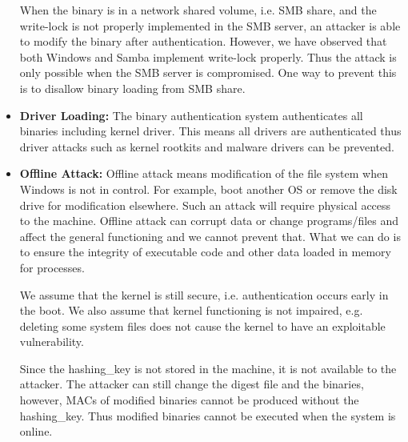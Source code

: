 \begin{itemize}
When the binary is in a network shared volume, i.e. SMB share,
and the write-lock is not properly implemented in the SMB server,
an attacker is able to modify the binary after authentication.
However, we have observed that both Windows and Samba
implement write-lock properly.
Thus the attack is only possible when the SMB server is compromised.
One way to prevent this is to disallow binary loading from SMB share.

\item {\bf Driver Loading:}
The binary authentication system authenticates all binaries including
kernel driver.
This means all drivers are authenticated thus driver attacks such as
kernel rootkits and malware drivers can be prevented.

\item {\bf Offline Attack:}
Offline attack means modification of the file system when Windows is
not in control.
For example, boot another OS or remove the disk drive for
modification elsewhere. Such an attack will require physical access
to the machine. Offline attack can corrupt data or change programs/files
and affect the general functioning and we cannot prevent that.
What we can do is to ensure the integrity of executable code and other data
loaded in memory for processes.

We assume that the kernel is still secure, i.e. authentication occurs early
in the boot.
We also assume that kernel functioning is not impaired, e.g. deleting some
system files does not cause the kernel to have an exploitable vulnerability.

Since the hashing\_key is not stored in the machine, it is not available
to the attacker.
The attacker can still change the digest file and the binaries,
however, MACs of modified binaries cannot be produced without the hashing\_key.
Thus modified binaries cannot be executed when the system is online.
\end{itemize}
